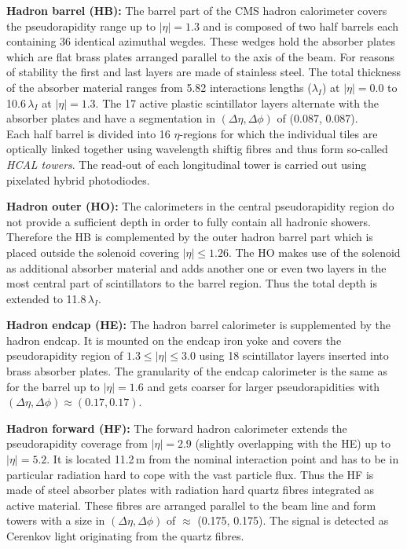 \begin{description}
 \item \textbf{Hadron barrel (HB):} The barrel part of the CMS hadron calorimeter covers the pseudorapidity range up to $|\eta| = 1.3$ and is composed of two half barrels each containing 36 identical azimuthal wegdes. These wedges hold the absorber plates which are flat brass plates arranged parallel to the axis of the beam. For reasons of stability the first and last layers are made of stainless steel. The total thickness of the absorber material ranges from 5.82 interactions lengths ($\lambda_I$) at $|\eta| = 0.0$ to 10.6\,$\lambda_I$ at $|\eta| = 1.3$. The 17 active plastic scintillator layers alternate with the absorber plates and have a segmentation in $(\Delta \eta, \Delta \phi)$ of (0.087, 0.087).\\
Each half barrel is divided into 16 $\eta$-regions for which the individual tiles are optically linked together using wavelength shiftig fibres and thus form so-called \textit{HCAL towers}. The read-out of each longitudinal tower is carried out using pixelated hybrid photodiodes.
 \item \textbf{Hadron outer (HO):} The calorimeters in the central pseudorapidity region do not provide a sufficient depth in order to fully contain all hadronic showers. Therefore the HB is complemented by the outer hadron barrel part which is placed outside the solenoid covering $|\eta| \le 1.26$. The HO makes use of the solenoid as additional absorber material and adds another one or even two layers in the most central part of scintillators to the barrel region. Thus the total depth is extended to 11.8\,$\lambda_I$.
 \item \textbf{Hadron endcap (HE):} The hadron barrel calorimeter is supplemented by the hadron endcap. It is mounted on the endcap iron yoke and covers the pseudorapidity region of $1.3 \le |\eta| \le 3.0$ using 18 scintillator layers inserted into brass absorber plates. The granularity of the endcap calorimeter is the same as for the barrel up to $|\eta| = 1.6$ and gets coarser for larger pseudorapidities with $(\Delta \eta, \Delta \phi) \approx (0.17, 0.17)$.
 \item \textbf{Hadron forward (HF):} The forward hadron calorimeter extends the pseudorapidity coverage from $|\eta| = 2.9$ (slightly overlapping with the HE) up to $|\eta| = 5.2$. It is located 11.2\,m from the nominal interaction point and has to be in particular radiation hard to cope with the vast particle flux. Thus the HF is made of steel absorber plates with radiation hard quartz fibres integrated as active material. These fibres are arranged parallel to the beam line and form towers with a size in $(\Delta \eta, \Delta \phi)$ of $\approx$ (0.175, 0.175). The signal is detected as Cerenkov light originating from the quartz fibres.
\end{description}
